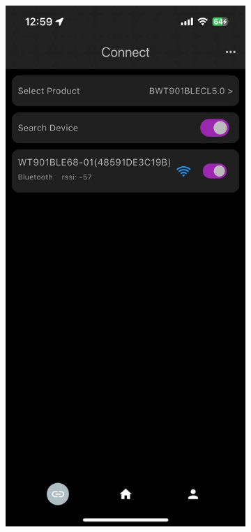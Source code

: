 \documentclass[12pt]{report}
\begin{document}
\begin{figure}[h]
    \centering
    \begin{subfigure}[b]{0.24\textwidth}
        \centering
        \includegraphics[width=\textwidth]{witmotion-app-interface-connect-screen}

\end{subfigure}
\end{figure}
\end{document}
